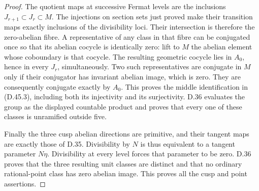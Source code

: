 \begin{proof}
The quotient maps at successive Fermat levels
are the inclusions \(J_{r+1}\subset J_r\subset M\).
The injections on section sets just proved make
their transition maps exactly inclusions of
the divisibility loci. Their intersection is
therefore the zero-abelian fibre. A representative
of any class in that fibre can be conjugated
once so that its abelian cocycle is identically
zero: lift to \(M\) the abelian element whose
coboundary is that cocycle. The resulting
geometric cocycle lies in \(A_0\), hence in
every \(J_r\), simultaneously. Two such
representatives are conjugate in \(M\) only
if their conjugator has invariant abelian
image, which is zero. They are consequently
conjugate exactly by \(A_0\). This proves the
middle identification in (D.45.3), including
both its injectivity and its surjectivity.
D.36 evaluates the group as the displayed
countable product and proves that every one
of these classes is unramified outside five.

Finally the three cusp abelian directions are
primitive, and their tangent maps are exactly
those of D.35. Divisibility by \(N\) is thus
equivalent to a tangent parameter \(N\eta\).
Divisibility at every level forces that
parameter to be zero. D.36 proves that the
three resulting unit classes are distinct
and that no ordinary rational-point class
has zero abelian image. This proves all
the cusp and point assertions.
\end{proof}

